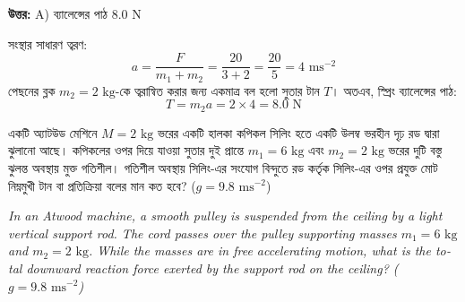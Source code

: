 \documentclass[12pt, a4paper]{article}
\begin{document}
{\vspace{0.5em}
\begin{tcolorbox}[answerbox]
\textbf{\color{success} উত্তর:} A) ব্যালেন্সের পাঠ $8.0\text{ N}$
\end{tcolorbox}
\vspace{1em}

\begin{tcolorbox}[solutionbox={সমাধান (Solution)}]
\noindent
সংস্থার সাধারণ ত্বরণ:
\[ a = \frac{F}{m_1 + m_2} = \frac{20}{3 + 2} = \frac{20}{5} = 4\text{ ms}^{-2} \]
পেছনের ব্লক $m_2 = 2\text{ kg}$-কে ত্বরান্বিত করার জন্য একমাত্র বল হলো সুতার টান $T$। 
অতএব, স্প্রিং ব্যালেন্সের পাঠ:
\[ T = m_2 a = 2 \times 4 = 8.0\text{ N} \]
\end{tcolorbox}

\newpage

\begin{tcolorbox}[questionbox={প্রশ্ন (Question) 15}]
\noindent
একটি অ্যাটউড মেশিনে $M = 2\text{ kg}$ ভরের একটি হালকা কপিকল সিলিং হতে একটি উলম্ব ভরহীন দৃঢ় রড দ্বারা ঝুলানো আছে। কপিকলের ওপর দিয়ে যাওয়া সুতার দুই প্রান্তে $m_1 = 6\text{ kg}$ এবং $m_2 = 2\text{ kg}$ ভরের দুটি বস্তু ঝুলন্ত অবস্থায় মুক্ত গতিশীল। গতিশীল অবস্থায় সিলিং-এর সংযোগ বিন্দুতে রড কর্তৃক সিলিং-এর ওপর প্রযুক্ত মোট নিম্নমুখী টান বা প্রতিক্রিয়া বলের মান কত হবে? ($g = 9.8\text{ ms}^{-2}$)

\vspace{0.8em}
\begin{english}
\noindent\textit{\color{darkgray}
In an Atwood machine, a smooth pulley is suspended from the ceiling by a light vertical support rod. The cord passes over the pulley supporting masses $m_1 = 6\text{ kg}$ and $m_2 = 2\text{ kg}$. While the masses are in free accelerating motion, what is the total downward reaction force exerted by the support rod on the ceiling? ($g = 9.8\text{ ms}^{-2}$)
}
\end{english}
\end{tcolorbox}

\vspace{1em}
\begin{center}
\end{center}}
\end{document}
